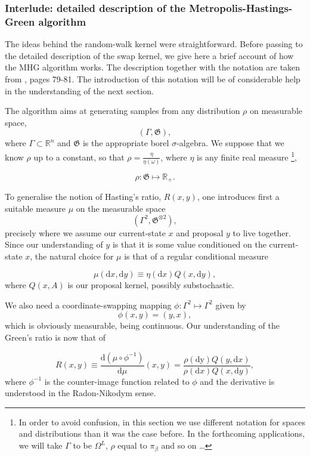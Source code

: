 \subsubsection*{Interlude: detailed description of the Metropolis-Hastings-Green algorithm}

	The ideas behind the random-walk kernel were straightforward. Before passing to the detailed description of the swap kernel, we give here a brief account of how the MHG algorithm works. The description together with the notation are taken from \cite{geyer}, pages 79-81. The introduction of this notation will be of considerable help in the understanding of the next section. 

	The algorithm aims at generating samples from any distribution $\rho$ on measurable space,
$$(\Gamma, \mathfrak{G}),$$
	where $\Gamma \subset \mathbb{R}^n$ and $\mathfrak{G}$ is the appropriate borel $\sigma$-algebra. We suppose that we know $\rho$ up to a constant, so that $\rho = \frac{\eta}{\eta(\omega)}$, where $\eta$ is any finite real measure \footnote{In order to avoid confusion, in this section we use different notation for spaces and distributions than it was the case before. In the forthcoming applications, we will take $\Gamma$ to be $\Omega^L$, $\rho$ equal to $\pi_\beta$ and so on \dots}, 

$$\rho: \mathfrak{G} \mapsto \mathbb{R}_{+}.$$  
	
	To generalise the notion of Hasting's ratio, $R(x,y)$, one introduces first a suitable measure $\mu$ on the measurable space $$(\Gamma^2, \mathfrak{G}^{\otimes 2}),$$ 
precisely where we assume our current-state $x$ and proposal $y$ to live together. Since our understanding of $y$ is that it is some value conditioned on the current-state $x$, the natural choice for $\mu$ is that of a regular conditional measure

$$\mu(\mathrm{d }x, \mathrm{d }y)   \equiv \eta (\mathrm{d} x) Q(x, \mathrm{d } y),$$
where $Q(x,A)$ is our proposal kernel, possibly substochastic.
 
 
We also need a coordinate-swapping mapping $\phi: \Gamma^2 \mapsto \Gamma^2$ given by $$\phi(x,y) = (y,x),$$ which is obviously measurable, being continuous. Our understanding of the Green's ratio is now that of

$$R(x,y) \equiv	\frac{\mathrm{d }(\mu \circ \phi^{-1})}{\mathrm{d }\mu} (x,y) = \frac{\rho(\mathrm{d y} )Q(y, \mathrm{d }x)}{\rho(\mathrm{d }x) Q(x, \mathrm{d }y)},$$
where $\phi^{-1}$ is the counter-image function related to $\phi$ and the derivative is understood in the Radon-Nikodym sense. 

